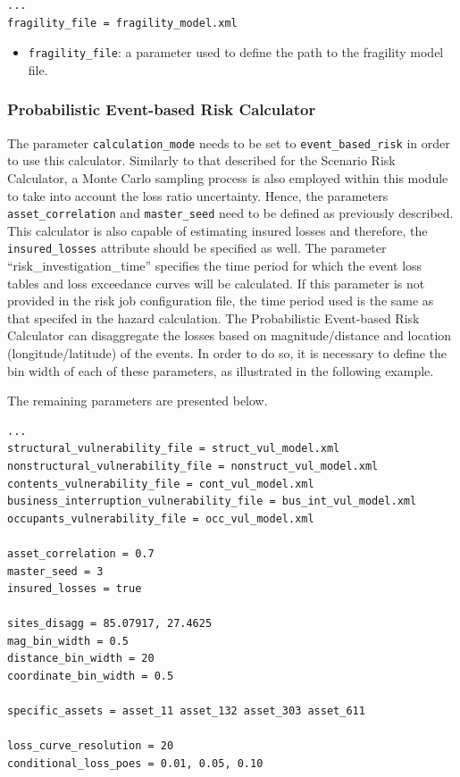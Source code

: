 \begin{Verbatim}[frame=single, commandchars=\\\{\}, samepage=true]
...
fragility_file = fragility_model.xml
\end{Verbatim}

\begin{itemize}
\item  \Verb+fragility_file+: a parameter used to define the path to the \gls{fragility model} file.
\end{itemize}

\subsubsection{Probabilistic Event-based Risk Calculator}
The parameter \Verb+calculation_mode+ needs to be set to \Verb+event_based_risk+ in order to use this calculator. Similarly to that described for the Scenario Risk Calculator, a Monte Carlo sampling process is also employed within this module to take into account the loss ratio uncertainty. Hence, the parameters \Verb+asset_correlation+ and \Verb+master_seed+ need to be defined as previously described. This calculator is also capable of estimating insured losses and therefore, the \Verb+insured_losses+ attribute should be specified as well. The parameter ``risk_investigation_time'' specifies the time period for which the event loss tables and loss exceedance curves will be calculated. If this parameter is not provided in the risk job configuration file, the time period used is the same as that specifed in the hazard calculation. The Probabilistic Event-based Risk Calculator can disaggregate the losses based on magnitude/distance and location (longitude/latitude) of the events. In order to do so, it is necessary to define the bin width of each of these parameters, as illustrated in the following example.

The remaining parameters are presented below.

\begin{Verbatim}[frame=single, commandchars=\\\{\}, samepage=true]
...
structural_vulnerability_file = struct_vul_model.xml
nonstructural_vulnerability_file = nonstruct_vul_model.xml
contents_vulnerability_file = cont_vul_model.xml
business_interruption_vulnerability_file = bus_int_vul_model.xml
occupants_vulnerability_file = occ_vul_model.xml

asset_correlation = 0.7
master_seed = 3
insured_losses = true

sites_disagg = 85.07917, 27.4625
mag_bin_width = 0.5
distance_bin_width = 20
coordinate_bin_width = 0.5

specific_assets = asset_11 asset_132 asset_303 asset_611

loss_curve_resolution = 20
conditional_loss_poes = 0.01, 0.05, 0.10
\end{Verbatim}

